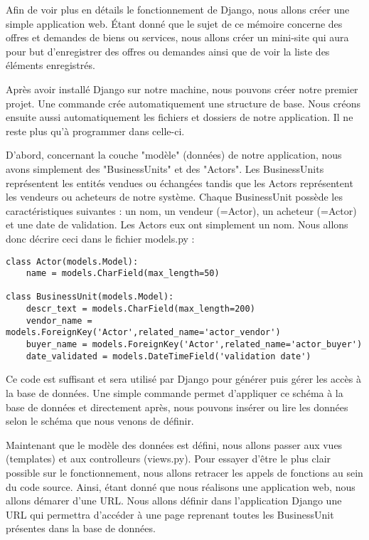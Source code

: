 Afin de voir plus en détails le fonctionnement de Django,  nous allons créer une simple application web.  Étant donné que le sujet de ce mémoire concerne des offres et demandes de biens ou services,  nous allons créer un mini-site qui aura pour but d'enregistrer des offres ou demandes ainsi que de voir la liste des éléments enregistrés.

Après avoir installé Django sur notre machine,  nous pouvons créer notre premier projet.  Une commande crée automatiquement une structure de base.  Nous créons ensuite aussi automatiquement les fichiers et dossiers de notre application.  Il ne reste plus qu'à programmer dans celle-ci.  

D'abord,  concernant la couche "modèle" (données) de notre application,  nous avons simplement des "BusinessUnits" et des "Actors".  Les BusinessUnits représentent les entités vendues ou échangées tandis que les Actors représentent les vendeurs ou acheteurs de notre système.  Chaque BusinessUnit possède les caractéristiques suivantes : un nom,  un vendeur (=Actor),  un acheteur (=Actor) et une date de validation.  Les Actors eux ont simplement un nom.  Nous allons donc décrire ceci dans le fichier models.py : 


\begin{lstlisting}
class Actor(models.Model):
	name = models.CharField(max_length=50)

class BusinessUnit(models.Model):
	descr_text = models.CharField(max_length=200)
	vendor_name = models.ForeignKey('Actor',related_name='actor_vendor')
	buyer_name = models.ForeignKey('Actor',related_name='actor_buyer')
	date_validated = models.DateTimeField('validation date')
\end{lstlisting}

Ce code est suffisant et sera utilisé par Django pour générer puis gérer les accès à la base de données.  Une simple commande permet d'appliquer ce schéma à la base de données et directement après,  nous pouvons insérer ou lire les données selon le schéma que nous venons de définir.

Maintenant que le modèle des données est défini,  nous allons passer aux vues (templates) et aux controlleurs (views.py).  Pour essayer d'être le plus clair possible sur le fonctionnement,  nous allons retracer les appels de fonctions au sein du code source.  Ainsi,  étant donné que nous réalisons une application web,  nous allons démarer d'une URL.  Nous allons définir dans l'application Django une URL qui permettra d'accéder à une page reprenant toutes les BusinessUnit présentes dans la base de données.

